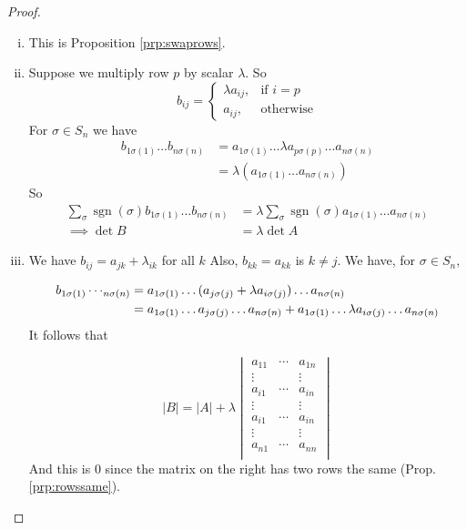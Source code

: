 \documentclass{article}
\theoremstyle{definition} \newtheorem*{definition}{Definition}
\DeclareMathOperator{\sgn}{sgn} \DeclareMathOperator{\id}{id}
\begin{document}
\begin{proof}\hfill \begin{enumerate}[(i)] \item This is Proposition
        \ref{prp:swaprows}.  \item Suppose we multiply row $p$ by scalar
          $\lambda$. So \[ b_{ij} = \begin{cases} \lambda a_{ij}, & \text{if }
              i=p \\ a_{ij}, & \text{otherwise} \end{cases} \] For $\sigma \in
            S_n$ we have \begin{align*} b_{1\sigma(1)}\dots b_{n\sigma(n)} &=
              a_{1\sigma(1)}\dots \lambda a_{p\sigma(p)}\dots a_{n \sigma(n)}
              \\ &= \lambda (  a_{1\sigma(1)}\dots  a_{n\sigma(n)} )
            \end{align*} So \begin{align*} \sum_\sigma \sgn (\sigma)
              b_{1\sigma(1)}\dots b_{n\sigma(n)} &= \lambda \sum_\sigma
              \sgn(\sigma)  a_{1\sigma(1)}\dots a_{n\sigma(n)}\\ \implies \det
              B &= \lambda \det A \end{align*} \item We have $b_{ij} = a_{jk} +
              \lambda_{ik}$ for all $k$ Also, $b_{kk}=a_{kk}$ is $k \neq j$. We
              have, for $\sigma \in S_n$,

      \begin{align*} b_{1\sigma(1)}\dotsb_{n\sigma(n)} &= a_{1 \sigma(1)} \dots
        ( a_{j \sigma(j)} + \lambda  a_{i \sigma(j)} ) \dots a_{n\sigma(n)} \\
        &= a_{{1}\sigma(1)} \dots a_{{j}\sigma(j)} \dots a_{{n}\sigma(n)} + a_{{1}\sigma(1)}
        \dots \lambda a_{i\sigma(j)} \dots a_{n\sigma(n)} \end{align*} It
      follows that

      \[ |B| = |A| + \lambda \begin{vmatrix} a_{11} & \cdots & a_{1n}\\ \vdots
          &        & \vdots \\ a_{i1} & \cdots & a_{in} \\ \vdots &        &
          \vdots \\ a_{i1} & \cdots & a_{in} \\ \vdots &        & \vdots \\
          a_{n1} & \cdots & a_{nn} \\ \end{vmatrix} \] And this is 0 since the
        matrix on the right has two rows the same (Prop. \ref{prp:rowssame}).
    \end{enumerate} \end{proof}
\end{document}
